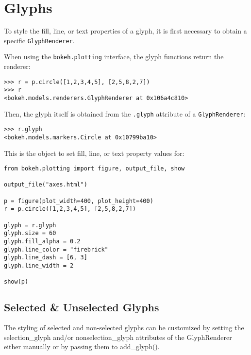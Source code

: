 

\section{Glyphs}
To style the fill, line, or text properties of a glyph, it is first necessary to obtain a specific \texttt{GlyphRenderer}. 

When using the \texttt{bokeh.plotting} interface, the glyph functions return the renderer:

\begin{framed}
\begin{verbatim}
>>> r = p.circle([1,2,3,4,5], [2,5,8,2,7])
>>> r
<bokeh.models.renderers.GlyphRenderer at 0x106a4c810>
\end{verbatim}
\end{framed}



Then, the glyph itself is obtained from the \texttt{.glyph} attribute of a \texttt{GlyphRenderer}:

\begin{framed}
	\begin{verbatim}
>>> r.glyph
<bokeh.models.markers.Circle at 0x10799ba10>
\end{verbatim}
\end{framed}
This is the object to set fill, line, or text property values for:

\begin{framed}
\begin{verbatim}
from bokeh.plotting import figure, output_file, show

output_file("axes.html")

p = figure(plot_width=400, plot_height=400)
r = p.circle([1,2,3,4,5], [2,5,8,2,7])

glyph = r.glyph
glyph.size = 60
glyph.fill_alpha = 0.2
glyph.line_color = "firebrick"
glyph.line_dash = [6, 3]
glyph.line_width = 2

show(p)
\end{verbatim}
\end{framed}
\subsection{Selected \& Unselected Glyphs}
The styling of selected and non-selected glyphs can be customized by setting the selection_glyph and/or nonselection_glyph attributes of the GlyphRenderer either manually or by passing them to add_glyph().

